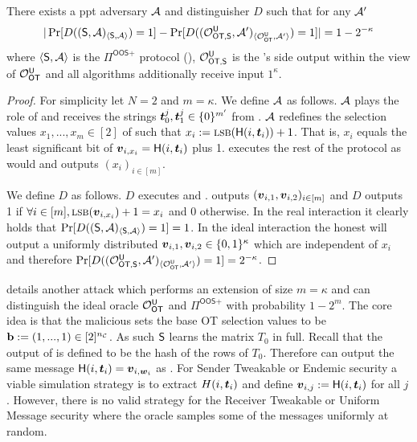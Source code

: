 \begin{lemma} \label{lem:malRec2}
	There exists a ppt adversary $\Adv$ and distinguisher $D$ such that for any $\Adv'$ 
	$$
	|\Pr[D((\send, \Adv)_{\langle\send, \Adv\rangle})=1]-\Pr[D((\O^{\U}_{\textsf{OT,\send}}, \Adv')_{\langle\OOT^\U, \Adv'\rangle})=1]|=1-2^{-\kappa}
	$$
	where $\langle\send, \Adv\rangle$ is the $\Pi^{\textsf{OOS+}}$ protocol (), $\O^{\U}_{\textsf{OT,\send}}$ is the \send's side output within the view of $\OOT^{\U}$ and all algorithms additionally receive input $1^\kappa$. 
\end{lemma}
\begin{proof}
	For simplicity let $N=2$ and $m=\kappa$. We define $\Adv$ as follows. $\Adv$ plays the role of \rec and receives the strings $\tt_0^j,\tt_1^j\in \{0\}^{m'}$ from \OOT. $\Adv$ redefines the selection values $x_1,...,x_m\in[2]$ of \rec such that $x_i:=\textsc{lsb}(\H(i, \tt_i))+1$. That is, $x_i$ equals the least significant bit of $\vv_{i,x_i}=\H(i, \tt_i)$ plus 1. \Adv executes the rest of the protocol as \rec would and outputs $(x_i)_{i\in [m]}$.
	
	We define $D$ as follows. $D$ executes \send and \Adv. \send outputs $(\vv_{i,1},\vv_{i,2})_{i\in[m]}$ and $D$ outputs 1 if $\forall i\in[m], \textsc{lsb}(\vv_{i,x_i})+1=x_i$ and 0 otherwise. In the real interaction it clearly holds that $\Pr[D((\send, \Adv)_{\langle\send, \Adv\rangle})=1]=1$. In the ideal interaction the honest \send will output a uniformly distributed $\vv_{i,1},\vv_{i,2}\in\{0,1\}^\kappa$ which are independent of $x_i$ and therefore $\Pr[D((\O^{\U}_{\textsf{OT,\send}}, \Adv')_{\langle\OOT^\U, \Adv'\rangle})=1]=2^{-\kappa}$.
\end{proof}



 details another attack which performs an extension of size $m=\kappa$ and can distinguish the ideal oracle $\OOT^\U$ and $\Pi^{\textsf{OOS+}}$ with probability $1-2^m$. The core idea is that the malicious \send sets the base OT selection values to be $\mathbf{b}:=(1,...,1)\in [2]^\nc$. As such $\send$ learns the matrix $T_0$ in full. Recall that the output of \rec is defined to be the hash of the rows of $T_0$. Therefore \send can output the same message $\H(i, \tt_i)=\vv_{i,\ww_i}$ as \rec. For Sender Tweakable or Endemic security a viable simulation strategy is to extract $H(i, \tt_i)$ and define $\vv_{i,j}:=\H(i, \tt_i)$ for all $j$. However, there is no valid strategy for the Receiver Tweakable or Uniform Message security where the oracle samples some of the messages uniformly at random.


